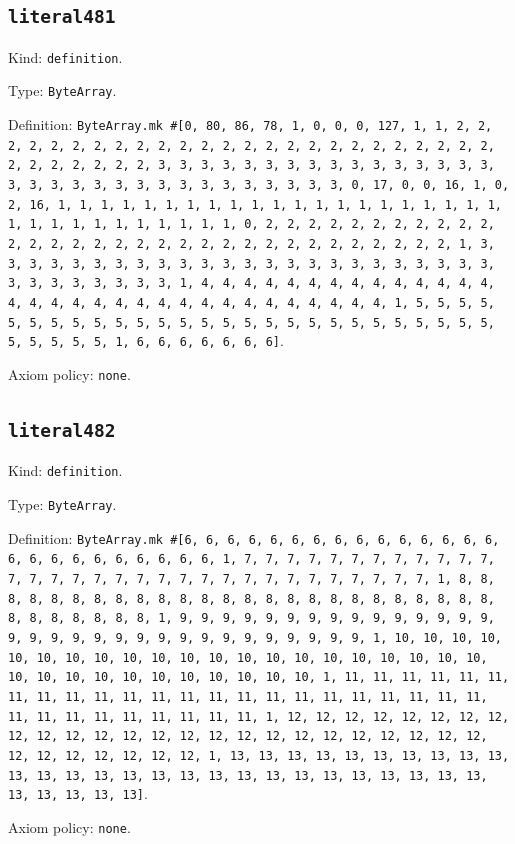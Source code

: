 \documentclass[11pt]{article}
\begin{document}
\subsection*{\texttt{literal481}}
\noindent Kind: \texttt{definition}.\par
\noindent Type: \texttt{ByteArray}.\par
\noindent Definition: \texttt{ByteArray.mk \#[0, 80, 86, 78, 1, 0, 0, 0, 127, 1, 1, 2, 2, 2, 2, 2, 2, 2, 2, 2, 2, 2, 2, 2, 2, 2, 2, 2, 2, 2, 2, 2, 2, 2, 2, 2, 2, 2, 2, 2, 2, 2, 2, 3, 3, 3, 3, 3, 3, 3, 3, 3, 3, 3, 3, 3, 3, 3, 3, 3, 3, 3, 3, 3, 3, 3, 3, 3, 3, 3, 3, 3, 3, 3, 3, 0, 17, 0, 0, 16, 1, 0, 2, 16, 1, 1, 1, 1, 1, 1, 1, 1, 1, 1, 1, 1, 1, 1, 1, 1, 1, 1, 1, 1, 1, 1, 1, 1, 1, 1, 1, 1, 1, 1, 1, 1, 0, 2, 2, 2, 2, 2, 2, 2, 2, 2, 2, 2, 2, 2, 2, 2, 2, 2, 2, 2, 2, 2, 2, 2, 2, 2, 2, 2, 2, 2, 2, 2, 2, 1, 3, 3, 3, 3, 3, 3, 3, 3, 3, 3, 3, 3, 3, 3, 3, 3, 3, 3, 3, 3, 3, 3, 3, 3, 3, 3, 3, 3, 3, 3, 3, 3, 1, 4, 4, 4, 4, 4, 4, 4, 4, 4, 4, 4, 4, 4, 4, 4, 4, 4, 4, 4, 4, 4, 4, 4, 4, 4, 4, 4, 4, 4, 4, 4, 4, 1, 5, 5, 5, 5, 5, 5, 5, 5, 5, 5, 5, 5, 5, 5, 5, 5, 5, 5, 5, 5, 5, 5, 5, 5, 5, 5, 5, 5, 5, 5, 5, 5, 1, 6, 6, 6, 6, 6, 6, 6]}.\par
\noindent Axiom policy: \texttt{none}.\par
\subsection*{\texttt{literal482}}
\noindent Kind: \texttt{definition}.\par
\noindent Type: \texttt{ByteArray}.\par
\noindent Definition: \texttt{ByteArray.mk \#[6, 6, 6, 6, 6, 6, 6, 6, 6, 6, 6, 6, 6, 6, 6, 6, 6, 6, 6, 6, 6, 6, 6, 6, 6, 1, 7, 7, 7, 7, 7, 7, 7, 7, 7, 7, 7, 7, 7, 7, 7, 7, 7, 7, 7, 7, 7, 7, 7, 7, 7, 7, 7, 7, 7, 7, 7, 7, 1, 8, 8, 8, 8, 8, 8, 8, 8, 8, 8, 8, 8, 8, 8, 8, 8, 8, 8, 8, 8, 8, 8, 8, 8, 8, 8, 8, 8, 8, 8, 8, 8, 1, 9, 9, 9, 9, 9, 9, 9, 9, 9, 9, 9, 9, 9, 9, 9, 9, 9, 9, 9, 9, 9, 9, 9, 9, 9, 9, 9, 9, 9, 9, 9, 9, 1, 10, 10, 10, 10, 10, 10, 10, 10, 10, 10, 10, 10, 10, 10, 10, 10, 10, 10, 10, 10, 10, 10, 10, 10, 10, 10, 10, 10, 10, 10, 10, 10, 1, 11, 11, 11, 11, 11, 11, 11, 11, 11, 11, 11, 11, 11, 11, 11, 11, 11, 11, 11, 11, 11, 11, 11, 11, 11, 11, 11, 11, 11, 11, 11, 11, 1, 12, 12, 12, 12, 12, 12, 12, 12, 12, 12, 12, 12, 12, 12, 12, 12, 12, 12, 12, 12, 12, 12, 12, 12, 12, 12, 12, 12, 12, 12, 12, 12, 1, 13, 13, 13, 13, 13, 13, 13, 13, 13, 13, 13, 13, 13, 13, 13, 13, 13, 13, 13, 13, 13, 13, 13, 13, 13, 13, 13, 13, 13, 13, 13, 13]}.\par
\noindent Axiom policy: \texttt{none}.\par
\end{document}
